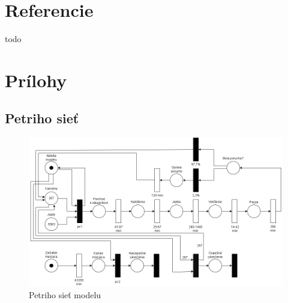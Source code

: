 \documentclass[a4paper, 11pt]{article}
\begin{document}
    \newpage
	\section{Referencie}
	todo

    \newpage
	\section{Prílohy}
    \subsection{Petriho sieť}
	\label{subsection:petri_net}
	\begin{figure}[!ht]
		\centering
		\vspace{1cm}
		\includegraphics[width=0.95\linewidth]{res/petri_net.png}
		\caption{Petriho sieť modelu}
		\label{figure:petri_net}
	\end{figure}
\end{document}
